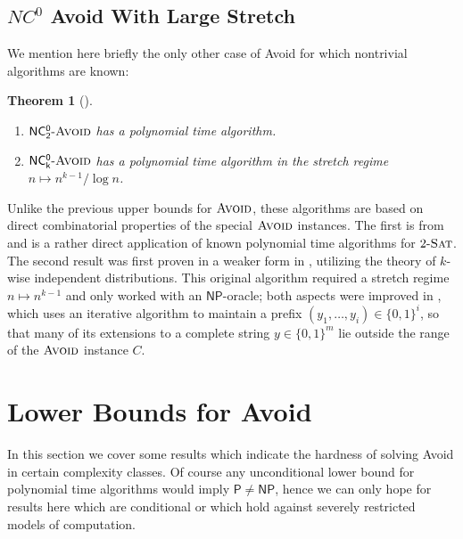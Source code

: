 \documentclass[11pt]{article}
\newtheorem{theorem}{Theorem}
\newcommand{\dash}{\text{-}}
\newcommand{\B}{\{0,1\}}
\newcommand{\avoid}{\textsc{Avoid}}
\begin{document}
\subsection{$NC^0$ Avoid With Large Stretch}
We mention here briefly the only other case of Avoid for which nontrivial algorithms are known:
\begin{theorem}[\cite{low-depth-avoid,karthik}]
~\begin{enumerate}
	\item $\mathsf{NC^0_2}\dash\avoid$ has a polynomial time algorithm.
	\item $\mathsf{NC^0_k}\dash\avoid$ has a polynomial time algorithm in the stretch regime $ n \mapsto n^{k-1}/\log n$.
\end{enumerate}
\end{theorem}

Unlike the previous upper bounds for $\avoid$, these algorithms are based on direct combinatorial properties of the special $\avoid$ instances. 
The first is from \cite{low-depth-avoid} and is a rather direct application of known polynomial time algorithms for $2\dash\textsc{Sat}$. The second result was first proven in a weaker form in \cite{low-depth-avoid}, utilizing the theory of $k$-wise independent distributions. This original algorithm required a stretch regime $n \mapsto n^{k-1}$ and only worked with an $\mathsf{NP}$-oracle; both aspects were improved in \cite{karthik}, which uses an iterative algorithm to maintain a prefix $(y_1,\ldots,y_i) \in \B^{i}$, so that many of its extensions to a complete string $y \in \B^m$ lie outside the range of the $\avoid $ instance $C$.

\section{Lower Bounds for Avoid}\label{sec:lower-bounds}
In this section we cover some results which indicate the hardness of solving Avoid in certain complexity classes. Of course any unconditional lower bound for polynomial time algorithms would imply $\mathsf{P} \neq \mathsf{NP}$, hence we can only hope for results here which are conditional or which hold against severely restricted models of computation. 
\end{document}
